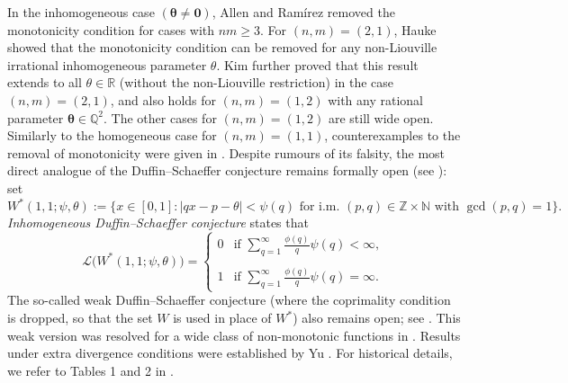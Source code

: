 \documentclass[12pt,a4paper,twoside]{article}
\begin{document}
In the inhomogeneous case \((\bm{\theta} \neq \bm{0})\), Allen and Ram\'{i}rez \cite{AR23} removed the monotonicity condition for cases with \(nm \ge 3\). For \((n,m) = (2,1)\), Hauke \cite{H25} showed that the monotonicity condition can be removed for any non-Liouville irrational inhomogeneous parameter \(\theta\). Kim \cite{K25} further proved that this result extends to all \(\theta \in \mathbb{R}\) (without the non-Liouville restriction) in the case \((n,m) = (2,1)\), and also holds for \((n,m) = (1,2)\) with any rational parameter \(\bm{\theta} \in \mathbb{Q}^2\). The other cases for \((n,m) = (1,2)\) are still wide open. Similarly to the homogeneous
case for $(n,m)=(1,1)$, counterexamples to the removal of monotonicity were given in \cite{CHPR25,R17}. Despite rumours of its falsity, the most direct analogue of the Duffin--Schaeffer conjecture remains formally open (see \cite{R17}):  set
$$ {W}^{\ast}(1,1;\psi,\theta):=\Big\{x\in [0,1]\colon  |qx-p-\theta|<\psi(q)\text{ for i.m. } (p,q)\in \mathbb{Z}\times \mathbb{N} \text{ with } \gcd(p,q)=1\Big\}.$$
{\em{Inhomogeneous Duffin--Schaeffer conjecture}} states that
\begin{equation*}
\mathcal{L}\big(W^{\ast}(1,1;\psi,\theta)\big)=\begin{cases}
   0   & \text{if $\sum_{q=1}^{\infty}\frac{\phi(q)}{q}\psi(q)<\infty$}, \\
   ~&\\
    1  & \text{if $\sum_{q=1}^{\infty}\frac{\phi(q)}{q}\psi(q)=\infty$}.
\end{cases}
\end{equation*}
The so-called weak Duffin--Schaeffer conjecture (where the coprimality condition is dropped, so that the set \(W\) is used in place of \(W^{\ast}\)) also remains open; see \cite[Conjecture 1.22]{CT24}. This weak version was resolved for a wide class of non-monotonic functions in \cite{C18,CT19,CT24}. Results under extra divergence conditions were established by Yu \cite{Y19,Y21}. For historical details, we refer to Tables 1 and 2 in \cite{HR24}.



 \medskip
\end{document}
